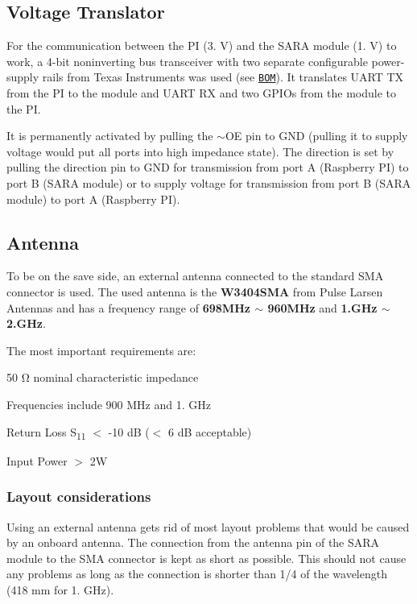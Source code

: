 \subsection*{Voltage Translator}

For the communication between the PI (3. V) and the S\+A\+RA module (1. V) to work, a 4-\/bit noninverting bus transceiver with two separate configurable power-\/supply rails from Texas Instruments was used (see \href{https://github.com/itsBelinda/ENG5220-2020-Team13/blob/master/hardware/PCBProduction/BEESAFE.BOM}{\tt {\ttfamily B\+OM}}). It translates U\+A\+RT TX from the PI to the module and U\+A\+RT RX and two G\+P\+I\+Os from the module to the PI.

It is permanently activated by pulling the $\sim$\+OE pin to G\+ND (pulling it to supply voltage would put all ports into high impedance state). The direction is set by pulling the direction pin to G\+ND for transmission from port A (Raspberry PI) to port B (S\+A\+RA module) or to supply voltage for transmission from port B (S\+A\+RA module) to port A (Raspberry PI).

\subsection*{Antenna}

To be on the save side, an external antenna connected to the standard S\+MA connector is used. The used antenna is the {\bfseries W3404\+S\+MA} from Pulse Larsen Antennas and has a frequency range of {\bfseries 698\+M\+Hz $\sim$ 960\+M\+Hz} and {\bfseries 1.\+G\+Hz $\sim$ 2.\+G\+Hz}.

The most important requirements are\+:
\begin{DoxyItemize}
\item 50 Ω nominal characteristic impedance
\item Frequencies include 900 M\+Hz and 1. G\+Hz
\item Return Loss S\textsubscript{11} $<$ -\/10 dB ($<$ 6 dB acceptable)
\item Input Power $>$ 2W
\end{DoxyItemize}

\subsubsection*{Layout considerations}

Using an external antenna gets rid of most layout problems that would be caused by an onboard antenna. The connection from the antenna pin of the S\+A\+RA module to the S\+MA connector is kept as short as possible. This should not cause any problems as long as the connection is shorter than 1/4 of the wavelength (418 mm for 1. G\+Hz).

